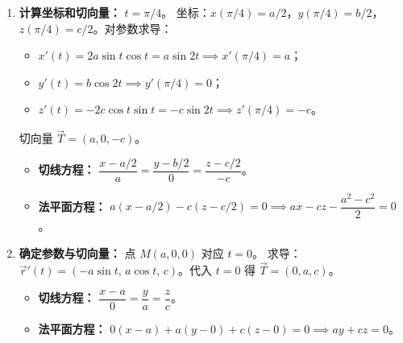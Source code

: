 \documentclass[lang=cn,11pt]{elegantbook}
\begin{document}
\begin{solution}
\begin{enumerate}
    \item[(3)] \textbf{计算坐标和切向量：} $t=\pi/4$。
    坐标：$x(\pi/4) = a/2$，$y(\pi/4) = b/2$，$z(\pi/4) = c/2$。对参数求导：
    \begin{itemize}
        \item $x'(t) = 2a\sin t\cos t = a\sin 2t \implies x'(\pi/4) = a$；
        \item $y'(t) = b\cos 2t \implies y'(\pi/4) = 0$；
        \item $z'(t) = -2c\cos t\sin t = -c\sin 2t \implies z'(\pi/4) = -c$。
    \end{itemize}
    切向量 $\vec{T} = (a, 0, -c)$。
    \begin{itemize}
        \item \textbf{切线方程：} $\dfrac{x-a/2}{a} = \dfrac{y-b/2}{0} = \dfrac{z-c/2}{-c}$。
        \item \textbf{法平面方程：} $a(x-a/2) - c(z-c/2) = 0 \implies ax - cz - \dfrac{a^2-c^2}{2} = 0$。
    \end{itemize}

    \item[(4)] \textbf{确定参数与切向量：} 点 $M(a,0,0)$ 对应 $t=0$。
    求导：$\vec{r}'(t) = (-a\sin t,\, a\cos t,\, c)$。代入 $t=0$ 得 $\vec{T} = (0, a, c)$。
    \begin{itemize}
        \item \textbf{切线方程：} $\dfrac{x-a}{0} = \dfrac{y}{a} = \dfrac{z}{c}$。
        \item \textbf{法平面方程：} $0(x-a) + a(y-0) + c(z-0) = 0 \implies ay+cz=0$。
    \end{itemize}
\end{enumerate}
\end{solution}
\end{document}
